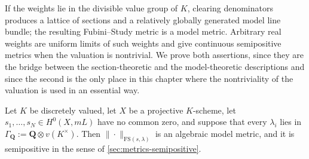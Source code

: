If the weights lie in the divisible value group of $K$, clearing
denominators produces a lattice of sections and a relatively globally
generated model line bundle; the resulting Fubini--Study metric is a model
metric. Arbitrary real weights are uniform limits of such weights and give
continuous semipositive metrics when the valuation is nontrivial. We prove
both assertions, since they are the bridge between the section-theoretic and
the model-theoretic descriptions and since the second is the only place in
this chapter where the nontriviality of the valuation is used in an
essential way.

\begin{proposition}
\label{prop:metrics-fs-model}
Let $K$ be discretely valued, let $X$ be a projective $K$-scheme, let
$s_1,\ldots,s_N\in H^0(X,mL)$ have no common zero, and suppose that every
$\lambda_i$ lies in $\Gamma_{\mathbf Q}:=\mathbf Q\otimes v(K^\times)$.
Then $\|\cdot\|_{\mathrm{FS}(s,\lambda)}$ is an algebraic model metric,
and it is semipositive in the sense of
\cref{sec:metrics-semipositive}.
\end{proposition}

